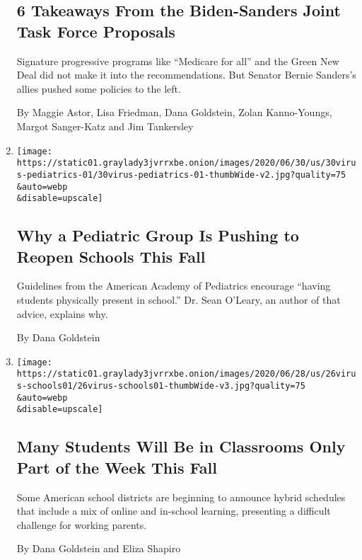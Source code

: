 \begin{enumerate}
{  \subsection{6 Takeaways From the Biden-Sanders Joint Task Force
  Proposals}\label{6-takeaways-from-the-biden-sanders-joint-task-force-proposals}}

  Signature progressive programs like ``Medicare for all'' and the Green
  New Deal did not make it into the recommendations. But Senator Bernie
  Sanders's allies pushed some policies to the left.

  By Maggie Astor, Lisa Friedman, Dana Goldstein, Zolan Kanno-Youngs,
  Margot Sanger-Katz and Jim Tankersley
\item
  \href{/2020/06/30/us/coronavirus-schools-reopening-guidelines-aap.html}{}

  \texttt{[image: https://static01.graylady3jvrrxbe.onion/images/2020/06/30/us/30virus-pediatrics-01/30virus-pediatrics-01-thumbWide-v2.jpg?quality=75\\\&auto=webp\\\&disable=upscale]}

  \hypertarget{why-a-pediatric-group-is-pushing-to-reopen-schools-this-fall}{%
  \subsection{Why a Pediatric Group Is Pushing to Reopen Schools This
  Fall}\label{why-a-pediatric-group-is-pushing-to-reopen-schools-this-fall}}

  Guidelines from the American Academy of Pediatrics encourage ``having
  students physically present in school.'' Dr. Sean O'Leary, an author
  of that advice, explains why.

  By Dana Goldstein
\item
  \href{/2020/06/26/us/coronavirus-schools-reopen-fall.html}{}

  \texttt{[image: https://static01.graylady3jvrrxbe.onion/images/2020/06/28/us/26virus-schools01/26virus-schools01-thumbWide-v3.jpg?quality=75\\\&auto=webp\\\&disable=upscale]}

  \hypertarget{many-students-will-be-in-classrooms-only-part-of-the-week-this-fall}{%
  \subsection{Many Students Will Be in Classrooms Only Part of the Week
  This
  Fall}\label{many-students-will-be-in-classrooms-only-part-of-the-week-this-fall}}

  Some American school districts are beginning to announce hybrid
  schedules that include a mix of online and in-school learning,
  presenting a difficult challenge for working parents.

  By Dana Goldstein and Eliza Shapiro
\end{enumerate}

